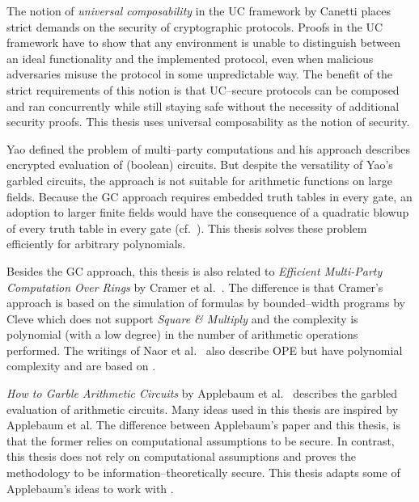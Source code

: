 %
%
\label{sec:related-work}

The notion of \emph{universal composability} in the UC framework by Canetti
\cite{canetti05} places strict demands on the security of cryptographic
protocols. Proofs in the UC framework have to show that any environment is
unable to distinguish between an ideal functionality and the implemented
protocol, even when malicious adversaries misuse the protocol in some
unpredictable way. The benefit of the strict requirements of this notion is that
UC--secure protocols can be composed and ran concurrently while still staying
safe without the necessity of additional security proofs. This thesis uses
universal composability as the notion of security.

Yao defined the problem of multi--party computations and his  approach \cite{yao86} describes encrypted evaluation of (boolean)
circuits. But despite the versatility of Yao's garbled circuits, the approach is
not suitable for arithmetic functions on large fields. Because the GC approach
requires embedded truth tables in every gate, an adoption to larger finite
fields would have the consequence of a quadratic blowup of every truth table in
every gate (cf.\ \cite{naor99privacy}). This thesis solves these problem
efficiently for arbitrary polynomials.

Besides the GC approach, this thesis is also related to \emph{Efficient
Multi-Party Computation Over Rings} by Cramer et al.~\cite{cramer03}. The
difference is that Cramer's approach is based on the simulation of formulas by
bounded--width programs by Cleve \cite{cleve91} which does not support
\emph{Square \& Multiply} \cite{knuth81} and the complexity is polynomial (with
a low degree) in the number of arithmetic operations performed. The writings of
Naor et al.~\cite{naor99,naor06} also describe OPE but have polynomial
complexity and are based on  \cite{rabin81}.

\emph{How to Garble Arithmetic Circuits} by Applebaum et al.~\cite{gac2012}
describes the garbled evaluation of arithmetic circuits.  Many ideas used in
this thesis are inspired by Applebaum et al. The difference between
Applebaum's paper and this thesis, is that the former relies on computational
assumptions to be secure. In contrast, this thesis does not rely on
computational assumptions and proves the methodology to be
information--theoretically secure. This thesis adapts some of Applebaum's ideas
to work with 
\cite{davidgoliath}.

